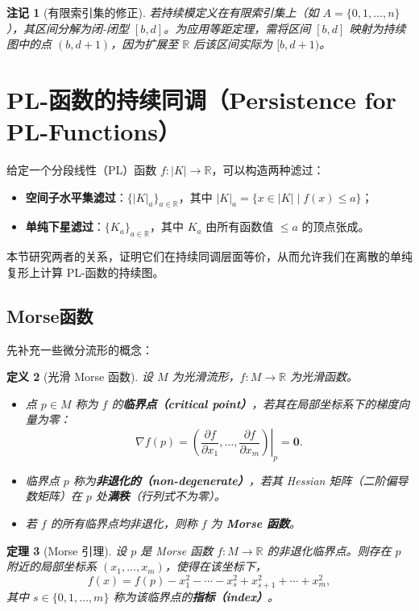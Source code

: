 \documentclass[UTF8]{ctexart}
\newtheorem{definition}{定义}[section]
\newtheorem{remark}[definition]{注记}
\newtheorem{theorem}[definition]{定理}
\begin{document}
\begin{remark}[有限索引集的修正]
若持续模定义在有限索引集上（如 \(A = \{0,1,\dots,n\}\)），其区间分解为闭-闭型 \([b,d]\)。为应用等距定理，需将区间 \([b,d]\) 映射为持续图中的点 \((b, d+1)\)，因为扩展至 \(\mathbb{R}\) 后该区间实际为 \([b, d+1)\)。
\end{remark}

\section{PL-函数的持续同调（Persistence for PL-Functions）}
\label{sec:pl-persistence}


给定一个分段线性（PL）函数 \(f: |K| \to \mathbb{R}\)，可以构造两种滤过：
\begin{itemize}
    \item \textbf{空间子水平集滤过}：\(\{|K|_a\}_{a \in \mathbb{R}}\)，其中 \(|K|_a = \{x \in |K| \mid f(x) \le a\}\)；
    \item \textbf{单纯下星滤过}：\(\{K_a\}_{a \in \mathbb{R}}\)，其中 \(K_a\) 由所有函数值 \(\le a\) 的顶点张成。
\end{itemize}
本节研究两者的关系，证明它们在持续同调层面等价，从而允许我们在离散的单纯复形上计算 PL-函数的持续图。

\subsection{Morse函数}
\label{subsec:morse-function}

先补充一些微分流形的概念：

\begin{definition}[光滑 Morse 函数]
\label{def:smooth-morse}
设 \(M\) 为光滑流形，\(f: M \to \mathbb{R}\) 为光滑函数。
\begin{itemize}
    \item 点 \(p \in M\) 称为 \(f\) 的\textbf{临界点（critical point）}，若其在局部坐标系下的梯度向量为零：
    \[
    \nabla f(p) = \left. \left( \frac{\partial f}{\partial x_1}, \dots, \frac{\partial f}{\partial x_m} \right) \right|_p = \mathbf{0}.
    \]
    \item 临界点 \(p\) 称为\textbf{非退化的（non-degenerate）}，若其 Hessian 矩阵（二阶偏导数矩阵）在 \(p\) 处\textbf{满秩}（行列式不为零）。
    \item 若 \(f\) 的所有临界点均非退化，则称 \(f\) 为 \textbf{Morse 函数}。
\end{itemize}
\end{definition}

\begin{theorem}[Morse 引理]
\label{thm:morse-lemma}
设 \(p\) 是 Morse 函数 \(f: M \to \mathbb{R}\) 的非退化临界点。则存在 \(p\) 附近的局部坐标系 \((x_1, \dots, x_m)\)，使得在该坐标下，
\[
f(x) = f(p) - x_1^2 - \cdots - x_s^2 + x_{s+1}^2 + \cdots + x_m^2,
\]
其中 \(s \in \{0, 1, \dots, m\}\) 称为该临界点的\textbf{指标（index）}。
\end{theorem}
\end{document}

